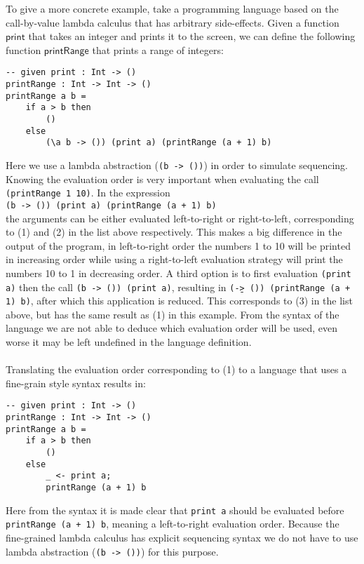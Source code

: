 {To give a more concrete example, take a programming language based on the call-by-value lambda calculus that has arbitrary side-effects. Given a function $\mathsf{print}$ that takes an integer and prints it to the screen, we can define the following function $\mathsf{printRange}$ that prints a range of integers:
\begin{verbatim}
-- given print : Int -> ()
printRange : Int -> Int -> ()
printRange a b =
	if a > b then
		()
	else
		(\a b -> ()) (print a) (printRange (a + 1) b)
\end{verbatim}
Here we use a lambda abstraction (\texttt{(\a b -> ())}) in order to simulate sequencing.
Knowing the evaluation order is very important when evaluating the call \texttt{(printRange 1 10)}.
In the expression
\\
\texttt{(\a b -> ()) (print a) (printRange (a + 1) b)}
\\
the arguments can be either evaluated left-to-right or right-to-left, corresponding to (1) and (2) in the list above respectively.
This makes a big difference in the output of the program, in left-to-right order the numbers 1 to 10 will be printed in increasing order while using a right-to-left evaluation strategy will print the numbers 10 to 1 in decreasing order.
A third option is to first evaluation \texttt{(print a)} then the call \texttt{(\a b -> ()) (print a)}, resulting in \texttt{(\b -> ()) (printRange (a + 1) b)}, after which this application is reduced. This corresponds to (3) in the list above, but has the same result as (1) in this example.
From the syntax of the language we are not able to deduce which evaluation order will be used, even worse it may be left undefined in the language definition.
\\\\
Translating the evaluation order corresponding to (1) to a language that uses a fine-grain style syntax results in:
\begin{verbatim}
-- given print : Int -> ()
printRange : Int -> Int -> ()
printRange a b =
	if a > b then
		()
	else
		_ <- print a;
		printRange (a + 1) b
\end{verbatim}
Here from the syntax it is made clear that \texttt{print a} should be evaluated before \texttt{printRange (a + 1) b}, meaning a left-to-right evaluation order. Because the fine-grained lambda calculus has explicit sequencing syntax we do not have to use lambda abstraction (\texttt{(\a b -> ())}) for this purpose.
}
